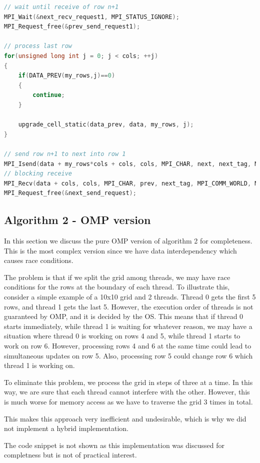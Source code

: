 \documentclass{report}
\begin{document}
\begin{lstlisting}[language=C++]
// wait until receive of row n+1
MPI_Wait(&next_recv_request1, MPI_STATUS_IGNORE);
MPI_Request_free(&prev_send_request1);

// process last row
for(unsigned long int j = 0; j < cols; ++j)
{
    if(DATA_PREV(my_rows,j)==0)
    {
        continue;
    }

    upgrade_cell_static(data_prev, data, my_rows, j);
}

// send row n+1 to next into row 1
MPI_Isend(data + my_rows*cols + cols, cols, MPI_CHAR, next, next_tag, MPI_COMM_WORLD, &next_send_request);
// blocking receive
MPI_Recv(data + cols, cols, MPI_CHAR, prev, next_tag, MPI_COMM_WORLD, MPI_STATUS_IGNORE);
MPI_Request_free(&next_send_request);
\end{lstlisting}

\subsection{Algorithm 2 - OMP version}

In this section we discuss the pure OMP version of algorithm 2 for completeness.
This is the most complex version since we have data interdependency which 
causes race conditions. 

The problem is that if we split the grid among threads, we may have race conditions 
for the rows at the boundary of each thread. 
To illustrate this, consider a simple example of a 10x10 grid and 2 threads. 
Thread 0 gets the first 5 rows, and thread 1 gets the last 5. However, the execution 
order of threads is not guaranteed by OMP, and it is decided by the OS. This means 
that if thread 0 starts immediately, while thread 1 is waiting for whatever reason, 
we may have a situation where thread 0 is working on rows 4 and 5, while thread 1 
starts to work on row 6. However, processing rows 4 and 6 at the same time could 
lead to simultaneous updates on row 5. Also, processing row 5 could change row 6 
which thread 1 is working on. 

To eliminate this problem, we process the grid in steps of three at a time. 
In this way, we are sure that each thread cannot interfere with the other. However, 
this is much worse for memory access as we have to traverse the grid 3 times in 
total.

This makes this approach very inefficient and undesirable, which is why we did not 
implement a hybrid implementation. 

The code snippet is not shown as this implementation was discussed for completness 
but is not of practical interest.
\end{document}
